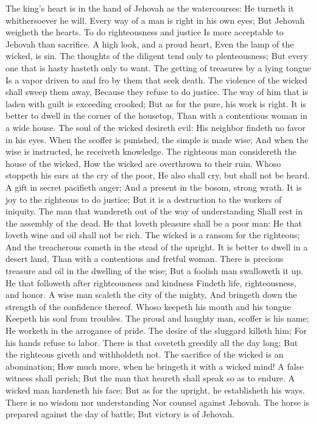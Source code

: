 The king’s heart is in the hand of Jehovah as the watercourses: He turneth it whithersoever he will.  Every way of a man is right in his own eyes; But Jehovah weigheth the hearts.  To do righteousness and justice Is more acceptable to Jehovah than sacrifice.  A high look, and a proud heart, Even the lamp of the wicked, is sin.  The thoughts of the diligent tend only to plenteousness; But every one that is hasty hasteth only to want.  The getting of treasures by a lying tongue Is a vapor driven to and fro by them that seek death.  The violence of the wicked shall sweep them away, Because they refuse to do justice.  The way of him that is laden with guilt is exceeding crooked; But as for the pure, his work is right.  It is better to dwell in the corner of the housetop, Than with a contentious woman in a wide house.  The soul of the wicked desireth evil: His neighbor findeth no favor in his eyes.  When the scoffer is punished, the simple is made wise; And when the wise is instructed, he receiveth knowledge.  The righteous man considereth the house of the wicked, How the wicked are overthrown to their ruin.  Whoso stoppeth his ears at the cry of the poor, He also shall cry, but shall not be heard.  A gift in secret pacifieth anger; And a present in the bosom, strong wrath.  It is joy to the righteous to do justice; But it is a destruction to the workers of iniquity.  The man that wandereth out of the way of understanding Shall rest in the assembly of the dead.  He that loveth pleasure shall be a poor man: He that loveth wine and oil shall not be rich.  The wicked is a ransom for the righteous; And the treacherous cometh in the stead of the upright.  It is better to dwell in a desert land, Than with a contentious and fretful woman.  There is precious treasure and oil in the dwelling of the wise; But a foolish man swalloweth it up.  He that followeth after righteousness and kindness Findeth life, righteousness, and honor.  A wise man scaleth the city of the mighty, And bringeth down the strength of the confidence thereof.  Whoso keepeth his mouth and his tongue Keepeth his soul from troubles.  The proud and haughty man, scoffer is his name; He worketh in the arrogance of pride.  The desire of the sluggard killeth him; For his hands refuse to labor.  There is that coveteth greedily all the day long; But the righteous giveth and withholdeth not.  The sacrifice of the wicked is an abomination; How much more, when he bringeth it with a wicked mind!  A false witness shall perish; But the man that heareth shall speak so as to endure.  A wicked man hardeneth his face; But as for the upright, he establisheth his ways.  There is no wisdom nor understanding Nor counsel against Jehovah.  The horse is prepared against the day of battle; But victory is of Jehovah. 

